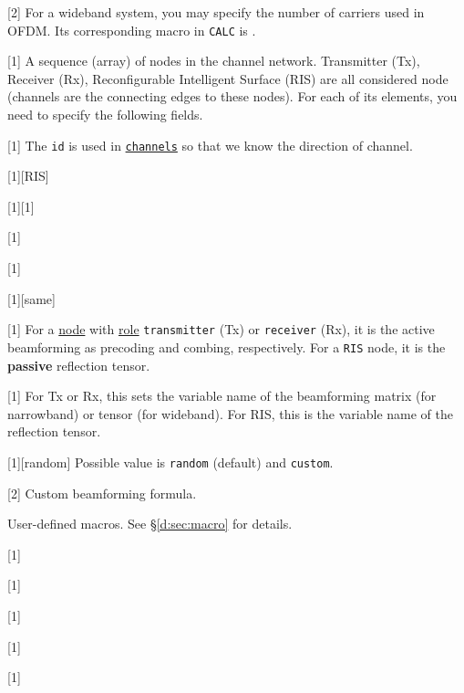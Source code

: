 [2]
For a wideband system,
you may specify the number of carriers used in OFDM.
Its corresponding
macro %
in
\texttt{CALC} %
is .

[1]
A sequence (array) of nodes in the channel network.
Transmitter (Tx), Receiver (Rx), Reconfigurable Intelligent Surface (RIS)
are all considered node (channels are the connecting edges to these nodes).
For each of its elements, you need to specify the following fields.

[1]
The \texttt{id} is used in \hyperref[d:subsec:sim_config_channels]{\texttt{channels}} so that we know the direction of channel.

[1][RIS]

[1][1]

[1]

[1]

[1][same]

[1]
For a \hyperref[d:subsec:sim_config_nodes]{node} with \hyperref[d:subsubsec:sim_config_nodes_role]{role}
\texttt{transmitter} (Tx) or \texttt{receiver} (Rx), it is the active beamforming as precoding and combing, respectively.
For a \texttt{RIS} node, it is the \textbf{passive} reflection tensor.

[1]
For Tx or Rx, this sets the variable name of the beamforming matrix (for narrowband) or tensor (for wideband).
For RIS, this is the variable name of the reflection tensor.

[1][random]
Possible value is \texttt{random} (default) and \texttt{custom}.

[2]
Custom beamforming formula.

User-defined macros.
See \S\ref{d:sec:macro} for details.

[1]

[1]

[1]

[1]

[1]

